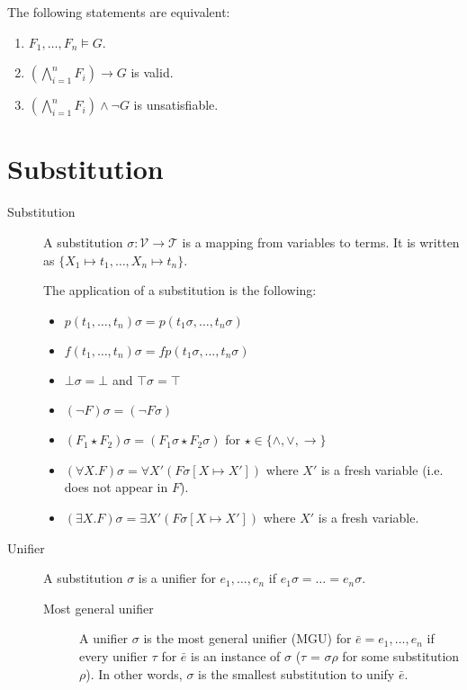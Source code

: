 \begin{theorem}
    The following statements are equivalent:
    \begin{enumerate}
        \item $F_1, \dots, F_n \models G$.
        \item $(\bigwedge_{i=1}^{n} F_i) \rightarrow G$ is valid.
        \item $(\bigwedge_{i=1}^{n} F_i) \land \lnot G$ is unsatisfiable.
    \end{enumerate}
\end{theorem}


\section{Substitution}

\begin{description}
    \item[Substitution] 
        A substitution $\sigma: \mathcal{V} \rightarrow \mathcal{T}$ is a mapping from variables to terms.
        It is written as $\{ X_1 \mapsto t_1, \dots, X_n \mapsto t_n \}$.

        The application of a substitution is the following:
        \begin{itemize}
            \item $p(t_1, \dots, t_n)\sigma = p(t_1\sigma, \dots, t_n\sigma)$
            \item $f(t_1, \dots, t_n)\sigma = fp(t_1\sigma, \dots, t_n\sigma)$
            \item $\bot\sigma = \bot$ and $\top\sigma = \top$
            \item $(\lnot F)\sigma = (\lnot F\sigma)$
            \item $(F_1 \star F_2)\sigma = (F_1\sigma \star F_2\sigma)$ for $\star \in \{ \land, \vee, \rightarrow \}$
            \item $(\forall X.F)\sigma = \forall X' (F \sigma[X \mapsto X'])$ where $X'$ is a fresh variable (i.e. does not appear in $F$).
            \item $(\exists X.F)\sigma = \exists X' (F \sigma[X \mapsto X'])$ where $X'$ is a fresh variable.
        \end{itemize}

    \item[Unifier] 
        A substitution $\sigma$ is a unifier for $e_1, \dots, e_n$ if $e_1\sigma = \dots = e_n\sigma$.
        
        \begin{description}
            \item[Most general unifier] 
                A unifier $\sigma$ is the most general unifier (MGU) for $\bar{e} = e_1, \dots, e_n$ if
                every unifier $\tau$ for $\bar{e}$ is an instance of $\sigma$ ($\tau$ = $\sigma\rho$ for some substitution $\rho$).
                In other words, $\sigma$ is the smallest substitution to unify $\bar{e}$.
        \end{description} 
\end{description}